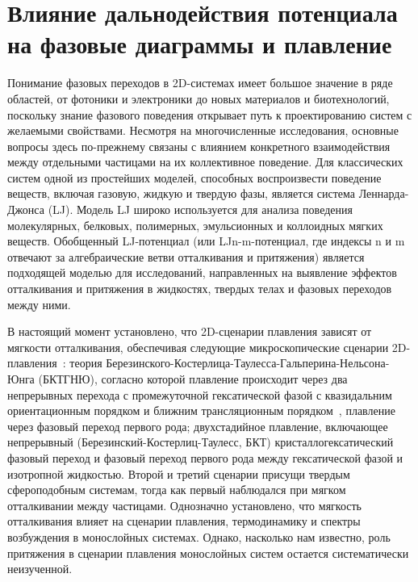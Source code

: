 \section{Влияние дальнодействия потенциала на фазовые диаграммы и плавление}

Понимание фазовых переходов в 2D-системах имеет большое значение в ряде областей, от фотоники и электроники до новых материалов и биотехнологий, поскольку знание фазового поведения открывает путь к проектированию систем с желаемыми свойствами. Несмотря на многочисленные исследования, основные вопросы здесь по-прежнему связаны с влиянием конкретного взаимодействия между отдельными частицами на их коллективное поведение. Для классических систем одной из простейших моделей, способных воспроизвести поведение веществ, включая газовую, жидкую и твердую фазы, является система Леннарда-Джонса (LJ). Модель LJ широко используется для анализа поведения молекулярных, белковых, полимерных, эмульсионных и коллоидных мягких веществ. Обобщенный LJ-потенциал (или LJn-m-потенциал, где индексы n и m отвечают за алгебраические ветви отталкивания и притяжения) является подходящей моделью для исследований, направленных на выявление эффектов отталкивания и притяжения в жидкостях, твердых телах и фазовых переходов между ними.

В настоящий момент установлено, что 2D-сценарии плавления зависят от мягкости отталкивания, обеспечивая следующие микроскопические сценарии 2D-плавления~\cite{10.3367/ufne.2017.06.038161, 10.3367/ufne.2018.04.038417}: теория Березинского-Костерлица-Таулесса-Гальперина-Нельсона-Юнга (БКТГНЮ), согласно которой плавление происходит через два непрерывных перехода с промежуточной гексатической фазой с квазидальним ориентационным порядком и ближним трансляционным порядком~\cite{10.1088/0022-3719/6/7/010, 10.1103/physrevlett.41.121, 10.1103/physrevb.19.2457, 10.1103/physrevb.19.1855}, плавление через фазовый переход первого рода; двухстадийное плавление, включающее непрерывный (Березинский-Костерлиц-Таулесс, БКТ) кристаллогексатический фазовый переход и фазовый переход первого рода между гексатической фазой и изотропной жидкостью.
Второй и третий сценарии присущи твердым сфероподобным системам, тогда как первый наблюдался при мягком отталкивании между частицами. Однозначно установлено, что мягкость отталкивания влияет на сценарии плавления, термодинамику и спектры возбуждения в монослойных системах. Однако, насколько нам известно, роль притяжения в сценарии плавления монослойных систем остается систематически неизученной.

